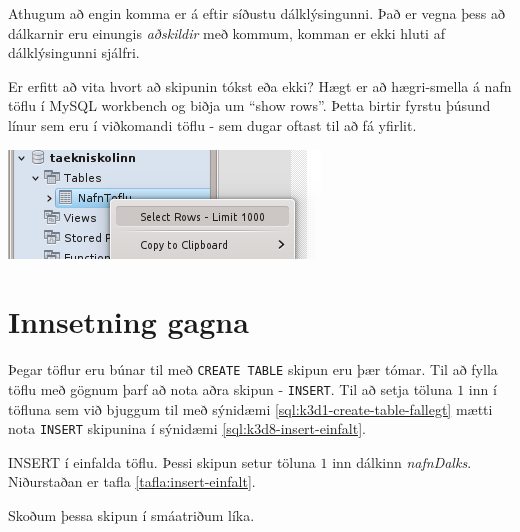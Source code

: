 Athugum að engin komma er á eftir síðustu dálklýsingunni. Það er vegna þess að dálkarnir eru einungis \emph{aðskildir} með kommum, komman er ekki hluti af dálklýsingunni sjálfri.

\begin{marginfigure}
\caption[Að sjá töflu í Workbench]{Er erfitt að vita hvort að skipunin tókst eða ekki? Hægt er að hægri-smella á nafn töflu í MySQL workbench og biðja um ``show rows''. Þetta birtir fyrstu þúsund línur sem eru í viðkomandi töflu - sem dugar oftast til að fá yfirlit.}
\label{mynd:}
\centering
\includegraphics[width=\linewidth]{myndir/workbench-select-rows}
\end{marginfigure}

\section{Innsetning gagna} %
\label{undirkafli:innsetning}
Þegar töflur eru búnar til með \verb|CREATE TABLE| skipun eru þær tómar. Til að fylla töflu með gögnum þarf að nota aðra skipun - \verb|INSERT|. Til að setja töluna $1$ inn í töfluna sem við bjuggum til með sýnidæmi \ref{sql:k3d1-create-table-fallegt} mætti nota \verb|INSERT| skipunina í sýnidæmi \ref{sql:k3d8-insert-einfalt}.

\begin{example}
\caption[INSERT í einfalda töflu]{INSERT í einfalda töflu. Þessi skipun setur töluna $1$ inn dálkinn \emph{nafnDalks}. Niðurstaðan er tafla \ref{tafla:insert-einfalt}.}
\label{sql:k3d8-insert-einfalt}
\centering
{}
\end{example}

Skoðum þessa skipun í smáatriðum líka. 

